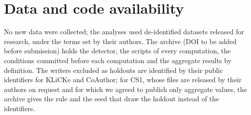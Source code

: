 \section*{Data and code availability}
\label{sec:availability}

No new data were collected; the analyses used de-identified datasets released for research, under the terms set by their authors. The
archive (DOI to be added before submission) holds the detector, the scripts of every computation, the conditions
committed before each computation and the aggregate results by definition. The writers excluded as holdouts are
identified by their public identifiers for KLiCKe and CoAuthor; for CS1, whose files are released by their authors on
request and for which we agreed to publish only aggregate values, the archive gives the rule and the seed that draw
the holdout instead of the identifiers.
